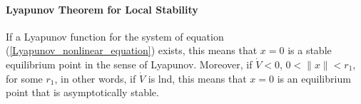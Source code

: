 \documentclass{thesisreport}
\begin{document}
\paragraph{Lyapunov Theorem for Local Stability}

If a Lyapunov function for the system of equation (\ref{Lyapunov_nonlinear_equation}) exists, this means that $x=0$ is a stable equilibrium point in the sense of Lyapunov. Moreover, if $\dot{V}<0$, $0<\|x\|<r_1$, for some $r_1$, in other words, if $\dot{V}$ is lnd, this means that $x=0$ is an equilibrium point that is asymptotically stable\cite{Dahleh2011}.

\end{document}
